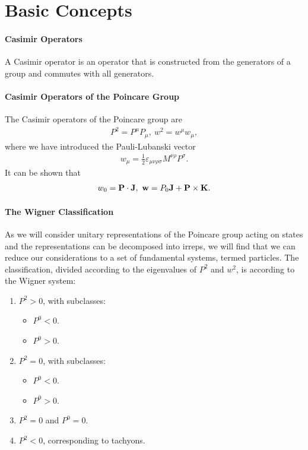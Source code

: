 \section{Basic Concepts}

\paragraph{Casimir Operators}
A Casimir operator is an operator that is constructed from the generators of a group and commutes with all generators.

\paragraph{Casimir Operators of the Poincare Group}
The Casimir operators of the Poincare group are
\begin{align*}
	P^{2} = P^{\mu}P_{\mu},\ w^{2} = w^{\mu}w_{\mu},
\end{align*}
where we have introduced the Pauli-Lubanski vector
\begin{align*}
	w_{\mu} = \frac{1}{2}\varepsilon_{\mu\nu\rho\sigma}M^{\nu\rho}P^{\sigma}. 
\end{align*}
It can be shown that
\begin{align*}
	w_{0} = \vb{P}\cdot\vb{J},\ \vb{w} = P_{0}\vb{J} + \vb{P}\times\vb{K}.
\end{align*}

\paragraph{The Wigner Classification}
As we will consider unitary representations of the Poincare group acting on states and the representations can be decomposed into irreps, we will find that we can reduce our considerations to a set of fundamental systems, termed particles. The classification, divided according to the eigenvalues of $P^{2}$ and $w^{2}$, is according to the Wigner system:
\begin{enumerate}
	\item $P^{2} > 0$, with subclasses:
	\begin{itemize}
		\item $P^{0} < 0$.
		\item $P^{0} > 0$.
	\end{itemize}
	\item $P^{2} = 0$, with subclasses:
	\begin{itemize}
		\item $P^{0} < 0$.
		\item $P^{0} > 0$.
	\end{itemize}
	\item $P^{2} = 0$ and $P^{0} = 0$.
	\item $P^{2} < 0$, corresponding to tachyons.
\end{enumerate}

